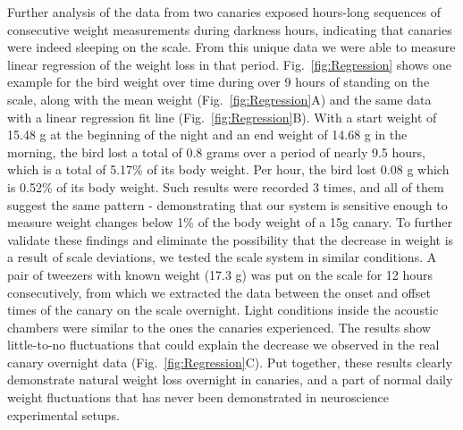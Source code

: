 \documentclass{article}
\begin{document}
Further analysis of the data from two canaries exposed hours-long sequences of consecutive weight measurements during darkness hours, indicating that canaries were indeed sleeping on the scale. From this unique data we were able to measure linear regression of the weight loss in that period. Fig.~\ref{fig:Regression} shows one example for the bird weight over time during over 9 hours of standing on the scale, along with the mean weight (Fig.~\ref{fig:Regression}A) and the same data with a linear regression fit line (Fig.~\ref{fig:Regression}B). With a start weight of 15.48 g at the beginning of the night and an end weight of 14.68 g in the morning, the bird lost a total of 0.8 grams over a period of nearly 9.5 hours, which is a total of 5.17\% of its body weight. Per hour, the bird lost 0.08 g which is 0.52\% of its body weight. Such results were recorded 3 times, and all of them suggest the same pattern - demonstrating that our system is sensitive enough to measure weight changes below 1\% of the body weight of a 15g canary. To further validate these findings and eliminate the possibility that the decrease in weight is a result of scale deviations, we tested the scale system in similar conditions. A pair of tweezers with known weight (17.3 g) was put on the scale for 12 hours consecutively, from which we extracted the data between the onset and offset times of the canary on the scale overnight. Light conditions inside the acoustic chambers were similar to the ones the canaries experienced. The results show little-to-no fluctuations that could explain the decrease we observed in the real canary overnight data (Fig.~\ref{fig:Regression}C). Put together, these results clearly demonstrate natural weight loss overnight in canaries, and a part of normal daily weight fluctuations \cite{lehikoinen1987seasonality} that has never been demonstrated in neuroscience experimental setups.
\end{document}
